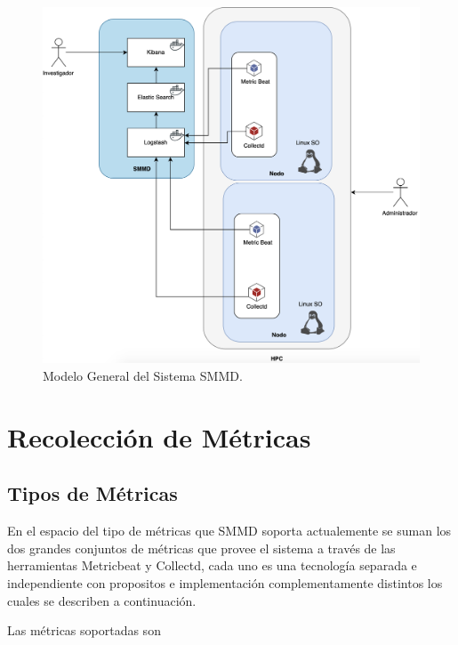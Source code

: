 \begin{figure}
 \centering
  \includegraphics[width=0.9\linewidth]{./imagenes/arquitectura-general.png}
  \caption{Modelo General del Sistema SMMD.}
  \label{fig:modelo-sistema}
\end{figure}


\newpage

\section{Recolección de Métricas}



\subsection{Tipos de Métricas}

En el espacio del tipo de métricas que SMMD soporta actualemente se suman los dos grandes conjuntos de métricas que provee el sistema a través de las herramientas Metricbeat y Collectd, cada uno es una tecnología separada e independiente con propositos e implementación complementamente distintos los cuales se describen a continuación.

Las métricas soportadas son 


